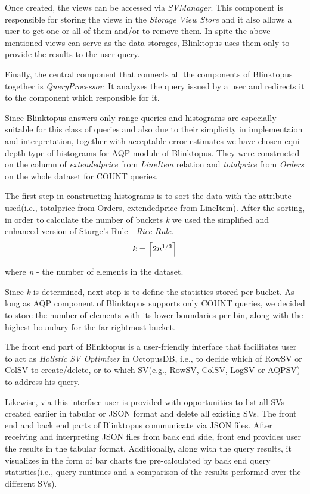 \documentclass[10pt, conference, compsocconf]{IEEEtran}
\DeclarePairedDelimiter\ceil{\lceil}{\rceil}
\begin{document}
Once created, the views can be accessed via \textit{SVManager}. This component is responsible for storing the views in the \textit{Storage View Store} and it also allows a user to get one or all of them and/or to remove them.
In spite the above-mentioned views can serve as the data storages, Blinktopus uses them only to provide the results to the user query. 

Finally, the central component that connects all the components of Blinktopus together is \textit{QueryProcessor}. It analyzes the query issued by a user and redirects it to the component which responsible for it.

Since Blinktopus answers only range queries and histograms are especially suitable for this class of queries and also due to their simplicity in implementaion and interpretation, together with acceptable error estimates we have chosen equi-depth type of histograms for AQP module of Blinktopus. They were constructed on the column of \textit{extendedprice} from \textit{LineItem} relation and \textit{totalprice} from \textit{Orders} on the whole dataset for COUNT queries.

The first step in constructing histograms is to sort the data with the attribute used(i.e., totalprice from Orders, extendedprice from LineItem). After the sorting, in order to calculate the number of buckets \textit{k} we used the simplified and enhanced version of Sturge's Rule - \textit{Rice Rule}.
\begin{equation}
k=\ceil*{2n^{1/3}}
\end{equation}

where \textit{n} - the number of elements in the dataset.
 
Since \textit{k} is determined, next step is to define the statistics stored per bucket. As long as AQP component of Blinktopus supports only COUNT queries, we decided to store the number of elements with its lower boundaries per bin, along with the highest boundary for the far rightmost bucket.

The front end part of Blinktopus is a user-friendly interface that facilitates user to act as \textit{Holistic SV Optimizer} in OctopusDB, i.e., to decide which of RowSV or ColSV to create/delete, or to which SV(e.g., RowSV, ColSV, LogSV or AQPSV) to address his query. 

Likewise, via this interface user is provided with opportunities to list all SVs created earlier in tabular or JSON format and delete all existing SVs.
The front end and back end parts of Blinktopus communicate via JSON files. After receiving and interpreting JSON files from back end side, front end provides user the results in the tabular format. Additionally, along with the query results, it visualizes in the form of bar charts the pre-calculated by back end query statistics(i.e., query runtimes and a comparison of the results performed over the different SVs).
\end{document}
